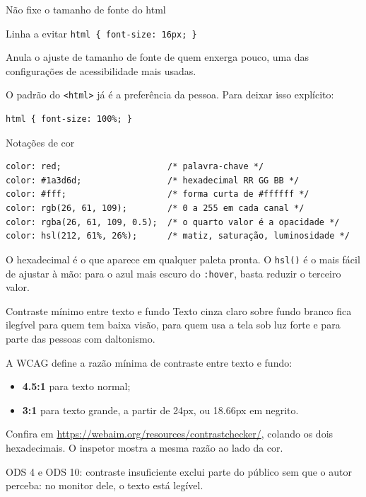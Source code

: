 \documentclass{beamer}
\begin{document}
\begin{frame}[fragile]{Não fixe o tamanho de fonte do html}
	\begin{alertblock}{Linha a evitar}
		\texttt{html \{ font-size: 16px; \}}
	\end{alertblock}

	\vspace{0.4cm}
	Anula o ajuste de tamanho de fonte de
	quem enxerga pouco, uma das configurações de acessibilidade mais usadas.

	\vspace{0.3cm}
	O padrão do \texttt{<html>} já é a preferência da pessoa. Para deixar isso
	explícito:

	\begin{verbatim}
html { font-size: 100%; }
  \end{verbatim}
\end{frame}

\begin{frame}[fragile]{Notações de cor}
	\begin{verbatim}
color: red;                     /* palavra-chave */
color: #1a3d6d;                 /* hexadecimal RR GG BB */
color: #fff;                    /* forma curta de #ffffff */
color: rgb(26, 61, 109);        /* 0 a 255 em cada canal */
color: rgba(26, 61, 109, 0.5);  /* o quarto valor é a opacidade */
color: hsl(212, 61%, 26%);      /* matiz, saturação, luminosidade */
  \end{verbatim}

	\vspace{0.2cm}
	O hexadecimal é o que aparece em qualquer paleta pronta. O \texttt{hsl()} é o
	mais fácil de ajustar à mão: para o azul mais escuro do \texttt{:hover}, basta
	reduzir o terceiro valor.
\end{frame}

\begin{frame}{Contraste mínimo entre texto e fundo}
	Texto cinza claro sobre fundo branco fica ilegível para quem tem baixa visão,
	para quem usa a tela sob luz forte e para parte das pessoas com daltonismo.

	\vspace{0.4cm}
	A WCAG define a razão mínima de contraste entre texto e fundo:

	\begin{itemize}
		\item \textbf{4.5:1} para texto normal;
		\item \textbf{3:1} para texto grande, a partir de 24px, ou 18.66px em
		      negrito.
	\end{itemize}

	\vspace{0.3cm}
	Confira em \url{https://webaim.org/resources/contrastchecker/}, colando os dois
	hexadecimais. O inspetor mostra a mesma razão ao lado da cor.

	\vspace{0.2cm}
	\small ODS 4 e ODS 10: contraste insuficiente exclui parte do público sem que
	o autor perceba: no monitor dele, o texto está legível.
\end{frame}
\end{document}

